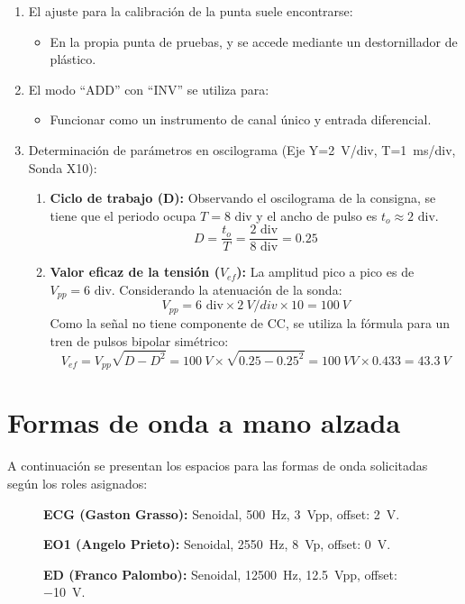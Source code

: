 \begin{enumerate}
    \item El ajuste para la calibración de la punta suele encontrarse:
    \begin{itemize}
        \item[B.] En la propia punta de pruebas, y se accede mediante un destornillador de plástico.
    \end{itemize}

    \item El modo ``ADD'' con ``INV'' se utiliza para:
    \begin{itemize}
        \item[B.] Funcionar como un instrumento de canal único y entrada diferencial.
    \end{itemize}

    \item Determinación de parámetros en oscilograma (Eje Y=\qty{2}{V/div}, T=\qty{1}{ms/div}, Sonda X10):
    \begin{enumerate}
        \item \textbf{Ciclo de trabajo (D):}
        Observando el oscilograma de la consigna, se tiene que el periodo ocupa $T = 8 \text{ div}$ y el ancho de pulso
        es $t_o \approx 2 \text{ div}$.
        \[ D = \frac{t_o}{T} = \frac{2 \text{ div}}{8 \text{ div}} = 0.25 \]
        \item \textbf{Valor eficaz de la tensión ($V_{ef}$):}
        La amplitud pico a pico es de $V_{pp} = 6 \text{ div}$. Considerando la atenuación de la sonda:
        \[ V_{pp} = 6 \text{ div} \times \qty{2}{V/div} \times 10 = \qty{100}{V} \]
        Como la señal no tiene componente de CC, se utiliza la fórmula para un tren de pulsos bipolar simétrico:
        \[ V_{ef} = V_{pp} \sqrt{D - D^2} = \qty{100}{V} \times \sqrt{0.25 - 0.25^2} = \qty{100}{V} V\times 0.433 = \qty{43.3}{V} \]
    \end{enumerate}
\end{enumerate}

\section{Formas de onda a mano alzada}
A continuación se presentan los espacios para las formas de onda solicitadas según los roles asignados:

    \begin{figure}[H]
        \centering
        \textbf{ECG (Gaston Grasso):} Senoidal, \qty{500}{Hz}, \qty{3}{Vpp}, offset: \qty{2}{V}.
        
    \end{figure}

    \begin{figure}[H]
        \centering
        \textbf{EO1 (Angelo Prieto):} Senoidal, \qty{2550}{Hz}, \qty{8}{Vp}, offset: \qty{0}{V}.
        
    \end{figure}

    \begin{figure}[H]
        \centering
        \textbf{ED (Franco Palombo):} Senoidal, \qty{12500}{Hz}, \qty{12.5}{Vpp}, offset: \qty{-10}{V}.
        
    \end{figure}
